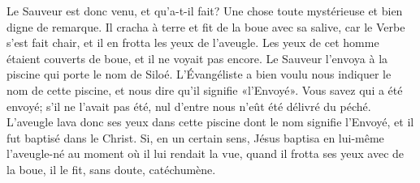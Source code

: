Le Sauveur est donc venu, et qu’a-t-il fait?
	Une chose toute mystérieuse et bien digne de remarque.
Il cracha à terre et fit de la boue avec sa salive,
	car le Verbe s’est fait chair,
	et il en frotta les yeux de l’aveugle.
Les yeux de cet homme étaient couverts de boue, et il ne voyait pas encore.
Le Sauveur l’envoya à la piscine qui porte le nom de Siloé.
L’Évangéliste a bien voulu nous indiquer le nom de cette piscine,
	et nous dire qu’il signifie «l’Envoyé».
Vous savez qui a été envoyé;
	s’il ne l’avait pas été, nul d’entre nous n’eût été délivré du péché.
L’aveugle lava donc ses yeux dans cette piscine dont le nom signifie l’Envoyé,
	et il fut baptisé dans le Christ.
Si, en un certain sens, Jésus baptisa en lui-même l’aveugle-né
		au moment où il lui rendait la vue,
	quand il frotta ses yeux avec de la boue, il le fit, sans doute, catéchumène.
